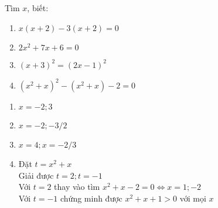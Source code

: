 \begin{ex}%
Tìm $x$, biết:
\begin{enumerate}  
\item $x(x+2) - 3(x+2)=0$
\item $2x^2+7x+6 = 0$
\item $(x+3)^2 = (2x -1)^2$
\item $(x^2+x)^2 - (x^2+x)-2 = 0$
\end{enumerate}
		\loigiai
		{
		\begin{enumerate} 
		\item $x = -2; 3$
		\item $x = -2; -3/2$
		\item $x = 4; x = -2/3$
		\item Đặt $t = x^2 + x$\\
Giải được $t = 2; t = -1$\\
Với $t = 2$ thay vào tìm $x^2 + x - 2 = 0 \Leftrightarrow x = 1; -2$\\
Với $t = -1$ chứng minh được $x^2 + x + 1 > 0$ với mọi $x$

				\end{enumerate}
		}
\end{ex}




